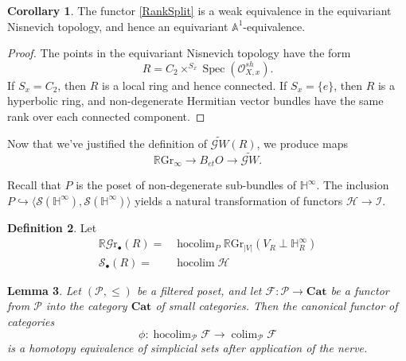 \documentclass[edeposit,fullpage]{uiucthesis2009}
\newcommand{\mbb}{\mathbb}
\newcommand{\mc}{\mathcal}
\newcommand{\RGr}{\mathbb R\mathrm{Gr}}
\newcommand{\hRGr}{\mathbb R\mathscr{G}{\mathrm{r}}}
\newcommand{\Cat}{\mathbf{Cat}}
\DeclareMathOperator{\Spec}{Spec}
\DeclareMathOperator*{\hocolim}{hocolim}
\DeclareMathOperator*{\colim}{colim}
\theoremstyle{plain}
\newtheorem{lemma}{Lemma}
\numberwithin{lemma}{section}
\theoremstyle{definition}
\newtheorem{corollary}[lemma]{Corollary}
\newtheorem{definition}[lemma]{Definition}
\begin{document}
\begin{corollary}
The functor \eqref{RankSplit} is a weak equivalence in the equivariant
Nisnevich topology, and hence an equivariant $\mbb A^1$-equivalence. 
\end{corollary}

\begin{proof}
The points in the equivariant Nisnevich topology have the form
\[
R = C_2 \times^{S_x} \Spec(\mc O^{sh}_{X,x}).
\]
If $S_x = C_2$, then $R$ is a local ring and hence connected. If $S_x
= \{e\}$, then $R$ is a hyperbolic ring, and non-degenerate Hermitian
vector bundles have the same rank over each connected component. 
\end{proof}

Now that we've justified the definition of $\widetilde{\mathscr
  GW}(R)$, we produce maps 
\[
\RGr_\infty \rightarrow B_{et} O \rightarrow \widetilde{\mathscr
  GW}.
\]

Recall that $P$ is the poset of non-degenerate sub-bundles of
$\mbb H^\infty$. The inclusion $P \hookrightarrow \langle \mc  S(\mbb
H^\infty),\mc S(\mbb H^\infty)\rangle$ yields a natural transformation
of functors $\mc H \rightarrow \mc I$. 

\begin{definition}
Let
\begin{align*}
\hRGr_\bullet(R) =& \hocolim_{P} \RGr_{|V|}(V_R
  \perp \mbb H^\infty_R)\\
\mathscr S_\bullet(R) =& \hocolim \mc H
\end{align*}
\end{definition}

\begin{lemma}
Let $(\mathscr P,\leq)$ be a filtered poset, and let $\mathscr F:
\mathscr P \rightarrow \Cat$ be a functor from $\mathscr P$ into the
category $\Cat$ of small categories. Then the canonical functor of categories
\[
\phi : \hocolim_{\mathscr P} \mathscr F \rightarrow \colim_{\mathscr
  P} \mathscr F
\]
is a homotopy equivalence of simplicial sets after application of the
nerve. 
\end{lemma}
\end{document}
